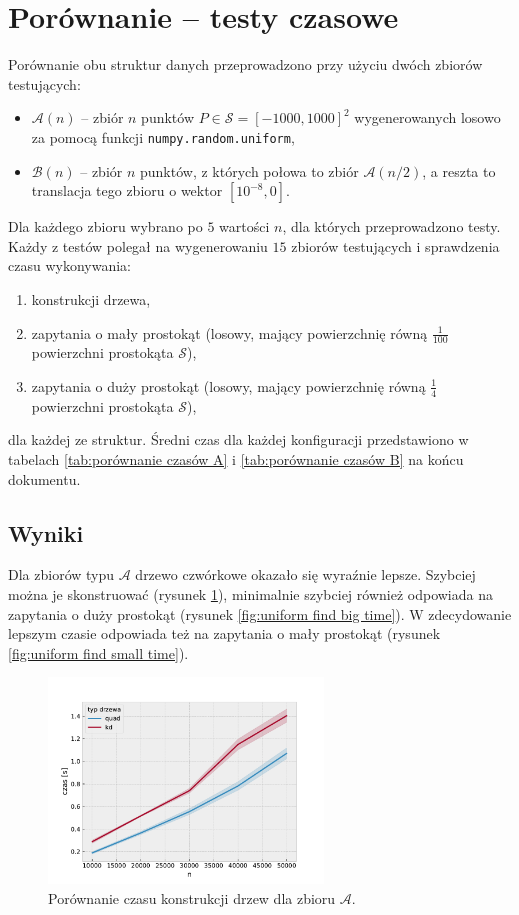 \documentclass[12pt]{scrartcl}
\newcommand{\sA}{\mathcal A}
\newcommand{\sB}{\mathcal B}
\newcommand{\sS}{\mathcal S}
\begin{document}
\section{Porównanie -- testy czasowe}
Porównanie obu struktur danych przeprowadzono przy użyciu dwóch zbiorów testujących:
\begin{itemize}
    \item $\sA(n)$ -- zbiór $n$ punktów $P \in \sS = [-1000, 1000]^2$ wygenerowanych losowo za pomocą funkcji \texttt{numpy.random.uniform},
    \item $\sB(n)$ -- zbiór $n$ punktów, z których połowa to zbiór $\sA(n/2)$, a reszta to translacja tego zbioru o wektor $[10^{-8}, 0]$.
\end{itemize}

Dla każdego zbioru wybrano po $5$ wartości $n$, dla których przeprowadzono testy. Każdy z testów polegał na wygenerowaniu $15$ zbiorów testujących i sprawdzenia czasu wykonywania:
\begin{enumerate}
    \item konstrukcji drzewa,
    \item zapytania o mały prostokąt (losowy, mający powierzchnię równą $\frac{1}{100}$ powierzchni prostokąta $\sS$),
    \item zapytania o duży prostokąt (losowy, mający powierzchnię równą $\frac{1}{4}$ powierzchni prostokąta $\sS$),
\end{enumerate}
dla każdej ze struktur. Średni czas dla każdej konfiguracji przedstawiono w tabelach \ref{tab:porównanie czasów A} i \ref{tab:porównanie czasów B} na końcu dokumentu.

\subsection{Wyniki}

Dla zbiorów typu $\sA$ drzewo czwórkowe okazało się wyraźnie lepsze. Szybciej można je skonstruować (rysunek \ref{fig:uniform construction time}), minimalnie szybciej również odpowiada na zapytania o duży prostokąt (rysunek \ref{fig:uniform find big time}). W zdecydowanie lepszym czasie odpowiada też na zapytania o mały prostokąt (rysunek \ref{fig:uniform find small time}).

\begin{figure}[H]
    \centering
    \includegraphics[width=0.65\textwidth]{imgs/uniform_construction_time}
    \caption{Porównanie czasu konstrukcji drzew dla zbioru $\sA$.}
    \label{fig:uniform construction time}
\end{figure}
\end{document}
